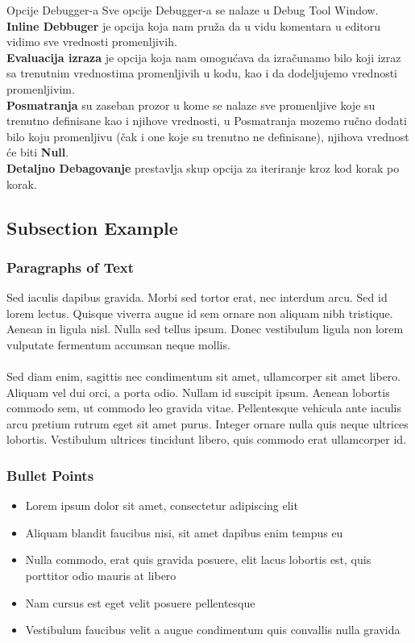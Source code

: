 \documentclass{beamer}
\begin{document}
\begin{frame}{Opcije Debugger-a}
Sve opcije Debugger-a se nalaze u Debug Tool Window.\\
\textbf{Inline Debbuger} je opcija koja nam pruža da u vidu komentara u editoru vidimo sve vrednosti promenljivih.\\
\textbf{Evaluacija izraza} je opcija koja nam omogućava da izračunamo bilo koji izraz sa trenutnim vrednostima promenljivih u kodu, kao i da dodeljujemo vrednosti promenljivim.\\
\textbf{Posmatranja} su zaseban prozor u kome se nalaze sve promenljive koje su trenutno definisane kao i njihove vrednosti, u Posmatranja mozemo ručno dodati bilo koju promenljivu (čak i one koje su trenutno ne definisane), njihova vrednost će biti \textbf{Null}.\\
\textbf{Detaljno Debagovanje} prestavlja skup opcija za iteriranje kroz kod korak po korak.
\end{frame}

\subsection{Subsection Example} %

\begin{frame}
\frametitle{Paragraphs of Text}
Sed iaculis dapibus gravida. Morbi sed tortor erat, nec interdum arcu. Sed id lorem lectus. Quisque viverra augue id sem ornare non aliquam nibh tristique. Aenean in ligula nisl. Nulla sed tellus ipsum. Donec vestibulum ligula non lorem vulputate fermentum accumsan neque mollis.\\~\\

Sed diam enim, sagittis nec condimentum sit amet, ullamcorper sit amet libero. Aliquam vel dui orci, a porta odio. Nullam id suscipit ipsum. Aenean lobortis commodo sem, ut commodo leo gravida vitae. Pellentesque vehicula ante iaculis arcu pretium rutrum eget sit amet purus. Integer ornare nulla quis neque ultrices lobortis. Vestibulum ultrices tincidunt libero, quis commodo erat ullamcorper id.
\end{frame}


\begin{frame}
\frametitle{Bullet Points}
\begin{itemize}
\item Lorem ipsum dolor sit amet, consectetur adipiscing elit
\item Aliquam blandit faucibus nisi, sit amet dapibus enim tempus eu
\item Nulla commodo, erat quis gravida posuere, elit lacus lobortis est, quis porttitor odio mauris at libero
\item Nam cursus est eget velit posuere pellentesque
\item Vestibulum faucibus velit a augue condimentum quis convallis nulla gravida
\end{itemize}
\end{frame}
\end{document}
